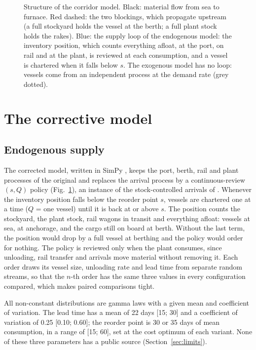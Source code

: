 \documentclass[conference]{IEEEtran}   %
\newcommand{\figdir}{figures}
\begin{document}
\begin{figure}[t]
\centering

\caption{Structure of the corridor model. Black: material flow from sea to furnace. Red
dashed: the two blockings, which propagate upstream (a full stockyard holds the vessel at the
berth; a full plant stock holds the rakes). Blue: the supply loop of the endogenous model: the
inventory position, which counts everything afloat, at the port, on rail and at the plant, is
reviewed at each consumption, and a vessel is chartered when it falls below $s$. The exogenous
model has no loop: vessels come from an independent process at the demand rate (grey dotted).}
\label{fig:structure}
\end{figure}

\section{The corrective model}
\label{sec:model}

\subsection{Endogenous supply}
The corrected model, written in SimPy \cite{simpy}, keeps the port, berth, rail and
plant processes of the original and replaces the arrival process by a continuous-review
$(s,Q)$ policy \cite{zipkin2000} (Fig.~\ref{fig:structure}), an instance of the
stock-controlled arrivals of \cite{vanasperen2003}. Whenever the inventory position falls below
the reorder point $s$, vessels are chartered one at a time ($Q$ = one vessel) until it is back
at or above $s$. The position counts the stockyard, the
plant stock, rail wagons in transit and everything afloat: vessels at sea, at anchorage, and
the cargo still on board at berth. Without the last term, the position would drop by a full
vessel at berthing and the policy would order for nothing. The policy is reviewed only when
the plant consumes, since unloading, rail transfer and arrivals move material without
removing it. Each order draws its vessel size, unloading rate and lead time from separate
random streams, so that the $n$-th order has the same three values in every configuration
compared, which makes paired comparisons tight.

All non-constant distributions are gamma laws with a given mean and coefficient of
variation. The lead time has a mean of 22 days [15; 30] and a coefficient of variation of
0.25 [0.10; 0.60]; the reorder point is 30 or 35 days of mean consumption, in a range of
[15; 60], set at the cost optimum of each variant. None of these three parameters has a
public source (Section~\ref{sec:limits}).
\end{document}
